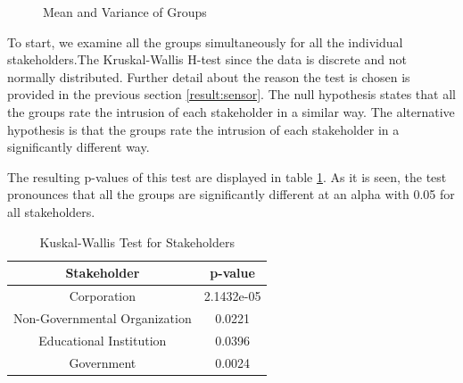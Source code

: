 \begin{figure}[htp]
\caption{Mean and Variance of Groups}
\label{fig:st3}
\end{figure}

To start, we examine all the groups simultaneously for all the individual stakeholders.The Kruskal-Wallis H-test since the data is discrete and not normally distributed. Further detail about the reason the test is chosen is provided in the previous section \ref{result:sensor}. The null hypothesis states that all the groups rate the intrusion of each stakeholder in a similar way. The alternative hypothesis is that the groups rate the intrusion of each stakeholder in a significantly different way.

The resulting p-values of this test are displayed in table \ref{tab:kw_stak}. As it is seen, the test pronounces that all the groups are significantly different at an alpha with 0.05 for all stakeholders. 


\begin{table}[h!]
  \centering
  \caption{Kuskal-Wallis Test for Stakeholders}
  \label{tab:kw_stak}
  \begin{tabular}{cc}
    \toprule
     Stakeholder & p-value \\
    \midrule
    Corporation & 2.1432e-05 \\
    Non-Governmental Organization & 0.0221\\
    Educational Institution & 0.0396\\
    Government & 0.0024\\ 
    \bottomrule
  \end{tabular}
\end{table}

